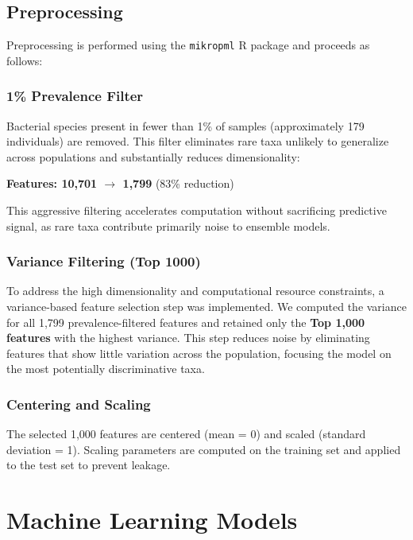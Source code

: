 \subsection{Preprocessing}

Preprocessing is performed using the \texttt{mikropml} R package and proceeds as follows:

\subsubsection{1\% Prevalence Filter}

Bacterial species present in fewer than 1\% of samples (approximately 179 individuals) are removed. This filter eliminates rare taxa unlikely to generalize across populations and substantially reduces dimensionality:

\begin{center}
\textbf{Features: 10,701 $\rightarrow$ 1,799} (83\% reduction)
\end{center}

This aggressive filtering accelerates computation without sacrificing predictive signal, as rare taxa contribute primarily noise to ensemble models.

\subsubsection{Variance Filtering (Top 1000)}

To address the high dimensionality and computational resource constraints, a variance-based feature selection step was implemented. We computed the variance for all 1,799 prevalence-filtered features and retained only the \textbf{Top 1,000 features} with the highest variance. This step reduces noise by eliminating features that show little variation across the population, focusing the model on the most potentially discriminative taxa.

\subsubsection{Centering and Scaling}

The selected 1,000 features are centered (mean = 0) and scaled (standard deviation = 1). Scaling parameters are computed on the training set and applied to the test set to prevent leakage.

\section{Machine Learning Models}

